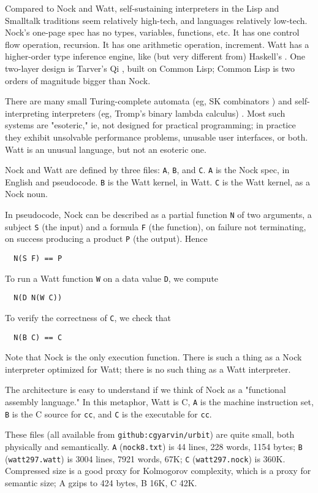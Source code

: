 \documentclass[10pt, nocopyrightspace]{sigplanconf}
\begin{document}
Compared to Nock and Watt, self-sustaining interpreters
in the Lisp and Smalltalk traditions seem relatively high-tech,
and languages relatively low-tech.  Nock's one-page spec has no
types, variables, functions, etc.  It has one control flow
operation, recursion.  It has one arithmetic operation,
increment.  Watt has a higher-order type inference engine, like
(but very different from) Haskell's \citep{haskell98}.  One two-layer design is
Tarver's Qi \citep{tarverqi}, built on Common Lisp; Common Lisp is two orders
of magnitude bigger than Nock.

There are many small Turing-complete automata (eg, SK combinators
\citep{skcombinator}) and self-interpreting interpreters (eg, Tromp's binary 
lambda calculus) \citep{tromp}.  Most such systems are "esoteric," ie, not
designed for practical programming; in practice they exhibit 
unsolvable performance problems, unusable user interfaces, or
both.  Watt is an unusual language, but not an esoteric one.

Nock and Watt are defined by three files: \verb|A|, \verb|B|, and \verb|C|.  \verb|A|
is the Nock spec, in English and pseudocode.  \verb|B| is the Watt
kernel, in Watt.  \verb|C| is the Watt kernel, as a Nock noun.

In pseudocode, Nock can be described as a partial function \verb|N| of
two arguments, a subject \verb|S| (the input) and a formula \verb|F| (the
function), on failure not terminating, on success producing a
product \verb|P| (the output).  Hence
\begin{verbatim}
  N(S F) == P
\end{verbatim}
To run a Watt function \verb|W| on a data value \verb|D|, we compute
\begin{verbatim}
  N(D N(W C))
\end{verbatim}
To verify the correctness of \verb|C|, we check that 
\begin{verbatim}
  N(B C) == C
\end{verbatim}

Note that Nock is the only execution function.  There is such a
thing as a Nock interpreter optimized for Watt; there is no such
thing as a Watt interpreter.

The architecture is easy to understand if we think of Nock as a
"functional assembly language."  In this metaphor, Watt is C, \verb|A|
is the machine instruction set, \verb|B| is the C source for \verb|cc|, and
\verb|C| is the executable for \verb|cc|.
 
These files (all available from \verb|github:cgyarvin/urbit|) are
quite small, both physically and semantically.  \verb|A| (\verb|nock8.txt|)
is 44 lines, 228 words, 1154 bytes; \verb|B|
(\verb|watt297.watt|) is 3004
lines, 7921 words, 67K; \verb|C| (\verb|watt297.nock|) is 360K.  Compressed
size is a good proxy for Kolmogorov complexity, which is a proxy
for semantic size; A gzips to 424 bytes, B 16K, C 42K.  
\end{document}
